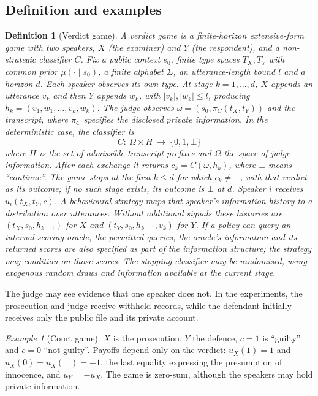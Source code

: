 \documentclass[10pt,a4paper]{article}
\newtheorem{definition}{Definition}
\theoremstyle{remark}
\newtheorem{example}{Example}
\newcommand{\Cont}{\bot}
\begin{document}
\subsection{Definition and examples}
\begin{definition}[Verdict game]\label{def:verdict}
A verdict game is a finite-horizon extensive-form game with two speakers, $X$ (the examiner) and $Y$ (the respondent),
and a non-strategic classifier $C$. Fix a public context $s_0$, finite type spaces $T_X,T_Y$ with common prior
$\mu(\cdot\mid s_0)$, a finite alphabet $\Sigma$, an utterance-length bound $l$ and a horizon $d$.
Each speaker observes its own type. At stage $k=1,\dots,d$, $X$ appends an utterance $v_k$ and then $Y$ appends
$w_k$, with $|v_k|,|w_k|\le l$, producing $h_k=(v_1,w_1,\dots,v_k,w_k)$. The judge observes
$\omega=(s_0,\pi_C(t_X,t_Y))$ and the transcript, where $\pi_C$ specifies the disclosed private information.
In the deterministic case, the classifier is
\begin{equation}
C:\ \Omega\times H\ \to\ \{0,1,\Cont\}
\end{equation}
where $H$ is the set of admissible transcript prefixes and $\Omega$ the space of judge information.
After each exchange it returns $c_k=C(\omega,h_k)$, where $\Cont$ means ``continue''. The game stops at the first $k\le d$ for which
$c_k\ne\Cont$, with that verdict as its outcome; if no such stage exists, its outcome is $\Cont$ at $d$.
Speaker $i$ receives $u_i(t_X,t_Y,c)$. A behavioural strategy maps that speaker's information history to a
distribution over utterances. Without additional signals these histories are $(t_X,s_0,h_{k-1})$ for $X$ and
$(t_Y,s_0,h_{k-1},v_k)$ for $Y$. If a policy can query an internal scoring oracle, the permitted queries, the
oracle's information and its returned scores are also specified as part of the information structure; the strategy
may condition on those scores. The stopping classifier may be randomised, using exogenous random draws and
information available at the current stage.
\end{definition}

The judge may see evidence that one speaker does not. In the experiments, the prosecution and judge receive
withheld records, while the defendant initially receives only the public file and its private account.

\begin{example}[Court game]
$X$ is the prosecution, $Y$ the defence, $c=1$ is ``guilty'' and $c=0$ ``not guilty''. Payoffs depend only on the
verdict: $u_X(1)=1$ and $u_X(0)=u_X(\Cont)=-1$, the last equality expressing the presumption of
innocence, and $u_Y=-u_X$. The game is zero-sum, although the speakers may hold private information.
\end{example}
\end{document}
